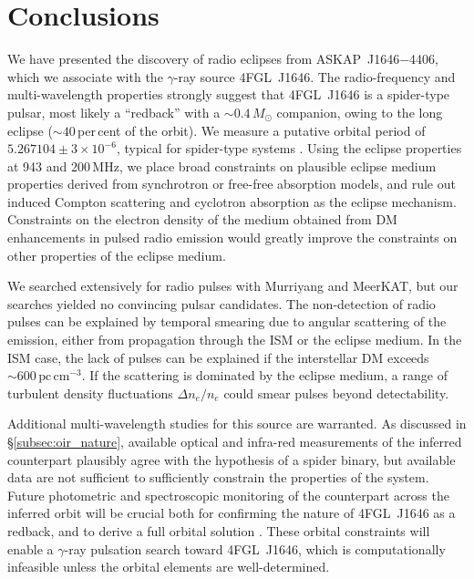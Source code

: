 \documentclass[fleqn,usenatbib]{mnras}
\newcommand{\todo}[1]{\textcolor{red}{TODO: #1}\PackageWarning{TODO:}{#1!}}
\newcommand{\blinky}{{4FGL}~J1646}
\newcommand{\periodh}{$5.267104\pm{3\times 10^{-6}}$}
\begin{document}


\section{Conclusions}\label{sec:conclusion}
We have presented the discovery of radio eclipses from ASKAP~J1646$-$4406, which we associate with the $\gamma$-ray source \blinky{}. The radio-frequency and multi-wavelength properties strongly suggest that \blinky{} is a spider-type pulsar, most likely a ``redback'' with a $\sim 0.4\,M_\odot$ companion, owing to the long eclipse ($\sim 40$\,per\,cent of the orbit). We measure a putative orbital period of \periodh{}, typical for spider-type systems \citep{2019ApJ...872...42S}. Using the eclipse properties at 943 and 200\,MHz, we place broad constraints on plausible eclipse medium properties derived from synchrotron or free-free absorption models, and rule out induced Compton scattering and cyclotron absorption as the eclipse mechanism. Constraints on the electron density of the medium obtained from DM enhancements in pulsed radio emission would greatly improve the constraints on other properties of the eclipse medium. 

We searched extensively for radio pulses with Murriyang and MeerKAT, but our searches yielded no convincing pulsar candidates. The non-detection of radio pulses can be explained by temporal smearing due to angular scattering of the emission, either from propagation through the ISM or the eclipse medium. In the ISM case, the lack of pulses can be explained if the interstellar DM exceeds $\sim 600\,\mathrm{pc}\,\mathrm{cm}^{-3}$. If the scattering is dominated by the eclipse medium, a range of turbulent density fluctuations $\Delta n_e/ n_e$ could smear pulses beyond detectability.

Additional multi-wavelength studies for this source are warranted. As discussed in \S\ref{subsec:oir_nature}, available optical and infra-red measurements of the inferred counterpart plausibly agree with the hypothesis of a spider binary, but available data are not sufficient to sufficiently constrain the properties of the system. Future photometric and spectroscopic monitoring of the counterpart across the inferred orbit will be crucial both for confirming the nature of \blinky{} as a redback, and to derive a full orbital solution \citep{2020ApJ...901..156N}. 
These orbital constraints will enable a $\gamma$-ray pulsation search toward \blinky{}, which is computationally infeasible unless the orbital elements are well-determined.
\end{document}
